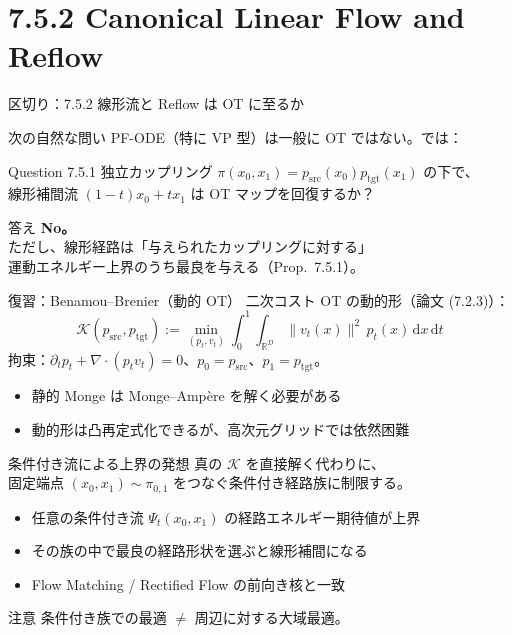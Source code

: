 \section{7.5.2 Canonical Linear Flow and Reflow}
\asmain
\begin{frame}{区切り：7.5.2 線形流と Reflow は OT に至るか}
    \tableofcontents[currentsection]
\end{frame}
\asmain
\begin{frame}{次の自然な問い}
    PF-ODE（特に VP 型）は一般に OT ではない。では：
    \begin{block}{Question 7.5.1}
        独立カップリング $\pi(x_0,x_1)=p_{\mathrm{src}}(x_0)p_{\mathrm{tgt}}(x_1)$ の下で、\\
        線形補間流 $(1-t)x_0+t x_1$ は OT マップを回復するか？
    \end{block}
    \begin{alertblock}{答え}
        \textbf{No。}\\
        ただし、線形経路は「与えられたカップリングに対する」\\
        運動エネルギー上界のうち最良を与える（Prop.\ 7.5.1）。
    \end{alertblock}
\end{frame}
\asmain
\begin{frame}{復習：Benamou--Brenier（動的 OT）}
    二次コスト OT の動的形（論文 (7.2.3)）：
    \[
        \mathcal{K}(p_{\mathrm{src}},p_{\mathrm{tgt}})
        :=
        \min_{(p_t,v_t)}
        \int_0^1\!\!\int_{\mathbb{R}^D}
        \|v_t(x)\|^2\,p_t(x)\,\mathrm{d}x\,\mathrm{d}t
    \]
    拘束：$\partial_t p_t+\nabla\cdot(p_t v_t)=0$、$p_0=p_{\mathrm{src}}$、$p_1=p_{\mathrm{tgt}}$。
    \begin{itemize}
        \item 静的 Monge は Monge--Amp\`ere を解く必要がある
        \item 動的形は凸再定式化できるが、高次元グリッドでは依然困難
    \end{itemize}
\end{frame}
\asmain
\begin{frame}{条件付き流による上界の発想}
    真の $\mathcal{K}$ を直接解く代わりに、\\
    固定端点 $(x_0,x_1)\sim\pi_{0,1}$ をつなぐ条件付き経路族に制限する。
    \begin{itemize}
        \item 任意の条件付き流 $\Psi_t(x_0,x_1)$ の経路エネルギー期待値が上界
        \item その族の中で最良の経路形状を選ぶと線形補間になる
        \item Flow Matching / Rectified Flow の前向き核と一致
    \end{itemize}
    \begin{exampleblock}{注意}
        条件付き族での最適 $\neq$ 周辺に対する大域最適。
    \end{exampleblock}
\end{frame}
